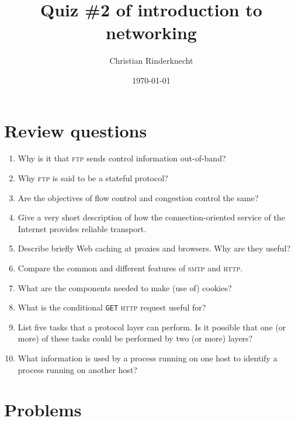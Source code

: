 \documentclass[11pt,a4paper]{article}
\title{Quiz \#2 of introduction to networking}
\author{Christian Rinderknecht}
\date{\today}
\begin{document}
\maketitle

\section{Review questions}

\begin{enumerate}

  \item Why is it that \textsc{ftp} sends control information
    out-of-band?

  \item Why \textsc{ftp} is said to be a stateful protocol?

  \item Are the objectives of flow control and congestion control the
    same?

  \item Give a very short description of how the connection-oriented
    service of the Internet provides reliable transport.

  \item Describe briefly Web caching at proxies and browsers. Why are
    they useful?

  \item Compare the common and different features of \textsc{smtp} and
    \textsc{http}.

  \item What are the components needed to make (use of) cookies?

  \item What is the conditional \texttt{GET} \textsc{http} request
    useful for?

  \item List five tasks that a protocol layer can perform. Is it
    possible that one (or more) of these tasks could be performed by
    two (or more) layers?

  \item What information is used by a process running on one host to
    identify a process running on another host?

\end{enumerate}

\section{Problems}
\end{document}
